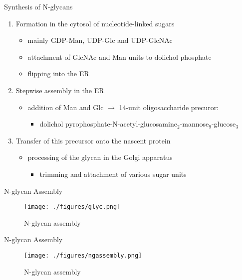 \documentclass[presentation, smaller]{beamer}
\begin{document}
\begin{frame}[label={sec:org34c445a}]{Synthesis of N-glycans}
\begin{enumerate}
\item Formation in the cytosol of nucleotide-linked sugars
\begin{itemize}
\item mainly GDP-Man, UDP-Glc and UDP-GlcNAc
\item attachment of GlcNAc and Man units to dolichol phosphate
\item flipping into the ER
\end{itemize}
\item Stepwise assembly in the ER
\begin{itemize}
\item addition of Man and Glc \(\to\) 14-unit oligosaccharide precuror:
\begin{itemize}
\item dolichol pyrophosphate-N-acetyl-glucosamine\(_{\text{2}}\)-mannose\(_{\text{9}}\)-glucose\(_{\text{3}}\)
\end{itemize}
\end{itemize}
\item Transfer of this precursor onto the nascent protein
\begin{itemize}
\item processing of the glycan in the Golgi apparatus
\begin{itemize}
\item trimming and attachment of various sugar units
\end{itemize}
\end{itemize}
\end{enumerate}
\end{frame}

\begin{frame}[label={sec:org2140e16}]{N-glycan Assembly}
\begin{figure}[htbp]
\centering
\texttt{[image: ./figures/glyc.png]}
\caption{\label{fig:org5cc62ed}
N-glycan assembly}
\end{figure}
\end{frame}


\begin{frame}[label={sec:orge067685}]{N-glycan Assembly}
\begin{figure}[htbp]
\centering
\texttt{[image: ./figures/ngassembly.png]}
\caption{\label{fig:orgfe7d647}
N-glycan assembly}
\end{figure}
\end{frame}
\end{document}
